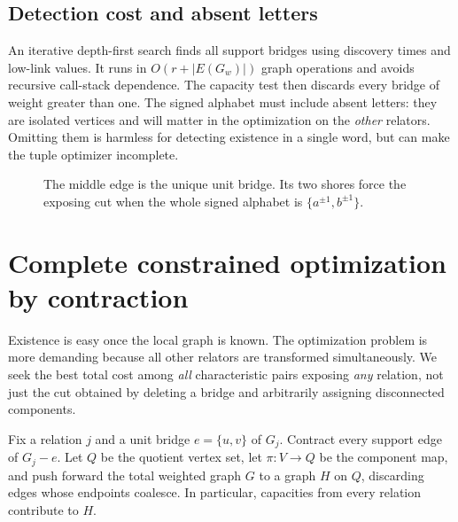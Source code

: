 \documentclass[11pt,letterpaper]{article}
\theoremstyle{definition}\newtheorem{definition}[theorem]{Definition}
\newcommand{\set}[1]{\{#1\}}
\begin{document}
\subsection{Detection cost and absent letters}
An iterative depth-first search finds all support bridges using discovery times and low-link values. It runs in $O(r+|E(G_w)|)$ graph operations and avoids recursive call-stack dependence. The capacity test then discards every bridge of weight greater than one. The signed alphabet must include absent letters: they are isolated vertices and will matter in the optimization on the \emph{other} relators. Omitting them is harmless for detecting existence in a single word, but can make the tuple optimizer incomplete.

\begin{figure}[ht]
\centering
{}
\caption{The middle edge is the unique unit bridge. Its two shores force the exposing cut when the whole signed alphabet is $\set{a^{\pm1},b^{\pm1}}$.}
\label{fig:bridge}
\end{figure}

\section{Complete constrained optimization by contraction}\label{sec:selector}
Existence is easy once the local graph is known. The optimization problem is more demanding because all other relators are transformed simultaneously. We seek the best total cost among \emph{all} characteristic pairs exposing \emph{any} relation, not just the cut obtained by deleting a bridge and arbitrarily assigning disconnected components.

Fix a relation $j$ and a unit bridge $e=\set{u,v}$ of $G_j$. Contract every support edge of $G_j-e$. Let $Q$ be the quotient vertex set, let $\pi:V\to Q$ be the component map, and push forward the total weighted graph $G$ to a graph $H$ on $Q$, discarding edges whose endpoints coalesce. In particular, capacities from every relation contribute to $H$.
\end{document}
